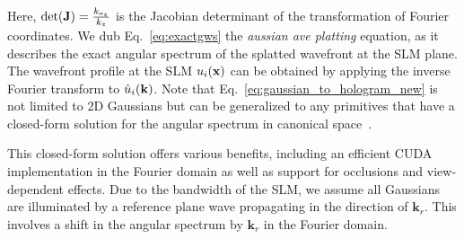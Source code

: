 Here, $\textrm{det} (\mathbf{J}) = \frac{k_{o_z}}{k_z}$ is the Jacobian determinant of the transformation of Fourier coordinates. We dub Eq.~\ref{eq:exactgws} the \textit{aussian ave platting} equation, as it describes the exact angular spectrum of the splatted wavefront at the SLM plane. The wavefront profile at the SLM $u_i(\mathbf{x})$ can be obtained by applying the inverse Fourier transform to $\hat{u}_i(\mathbf{k})$.  Note that Eq.~\ref{eq:gaussian_to_hologram_new} is not limited to 2D Gaussians but can be generalized to any primitives that have a closed-form solution for the angular spectrum in canonical space~\cite{kim2008mathematical, ahrenberg2008computer}.




This closed-form solution offers various benefits, including an efficient CUDA implementation in the Fourier domain as well as support for occlusions and view-dependent effects. Due to the bandwidth of the SLM, we assume all Gaussians are illuminated by a reference plane wave propagating in the direction of $\mathbf{k}_r$. This involves a shift in the angular spectrum by $\mathbf{k}_r$ in the Fourier domain.%




